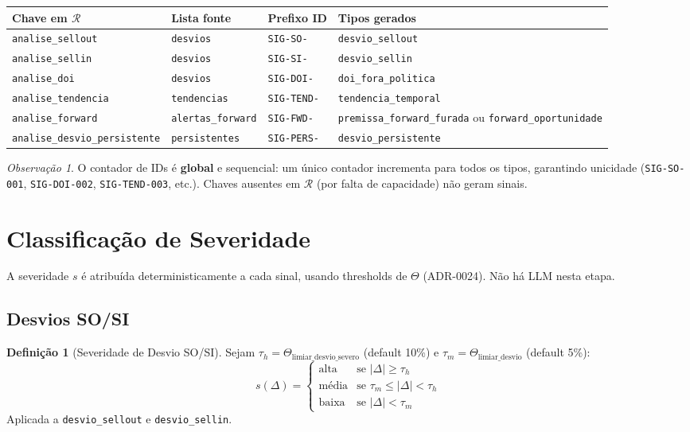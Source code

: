 \documentclass[a4paper, 12pt]{report}
\theoremstyle{definition}
\newtheorem{definicao}{Defini\c{c}\~ao}[chapter]
\theoremstyle{remark}
\newtheorem{observacao}{Observa\c{c}\~ao}[chapter]
\begin{document}
\begin{center}
\begin{tabular}{llll}
  \toprule
  \textbf{Chave em $\mathcal{R}$} & \textbf{Lista fonte} & \textbf{Prefixo ID} & \textbf{Tipos gerados} \\
  \midrule
  \texttt{analise\_sellout} & \texttt{desvios} & \texttt{SIG-SO-} & \texttt{desvio\_sellout} \\
  \texttt{analise\_sellin} & \texttt{desvios} & \texttt{SIG-SI-} & \texttt{desvio\_sellin} \\
  \texttt{analise\_doi} & \texttt{desvios} & \texttt{SIG-DOI-} & \texttt{doi\_fora\_politica} \\
  \texttt{analise\_tendencia} & \texttt{tendencias} & \texttt{SIG-TEND-} & \texttt{tendencia\_temporal} \\
  \texttt{analise\_forward} & \texttt{alertas\_forward} & \texttt{SIG-FWD-} & \texttt{premissa\_forward\_furada} ou \texttt{forward\_oportunidade} \\
  \texttt{analise\_desvio\_persistente} & \texttt{persistentes} & \texttt{SIG-PERS-} & \texttt{desvio\_persistente} \\
  \bottomrule
\end{tabular}
\end{center}

\begin{observacao}
  O contador de IDs \'e \textbf{global} e sequencial: um \'unico contador
  incrementa para todos os tipos, garantindo unicidade
  (\texttt{SIG-SO-001}, \texttt{SIG-DOI-002}, \texttt{SIG-TEND-003}, etc.).
  Chaves ausentes em $\mathcal{R}$ (por falta de capacidade) n\~ao geram sinais.
\end{observacao}


\section{Classifica\c{c}\~ao de Severidade}

A severidade $s$ \'e atribu\'ida deterministicamente a cada sinal,
usando thresholds de $\Theta$ (ADR-0024). N\~ao h\'a LLM nesta etapa.

\subsection{Desvios SO/SI}

\begin{definicao}[Severidade de Desvio SO/SI]
  Sejam $\tau_h = \Theta_{\text{limiar\_desvio\_severo}}$ (default 10\%) e
  $\tau_m = \Theta_{\text{limiar\_desvio}}$ (default 5\%):
  \[
    s(\Delta) = \begin{cases}
      \text{alta} & \text{se } |\Delta| \geq \tau_h \\
      \text{m\'edia} & \text{se } \tau_m \leq |\Delta| < \tau_h \\
      \text{baixa} & \text{se } |\Delta| < \tau_m
    \end{cases}
  \]
  Aplicada a \texttt{desvio\_sellout} e \texttt{desvio\_sellin}.
\end{definicao}
\end{document}
